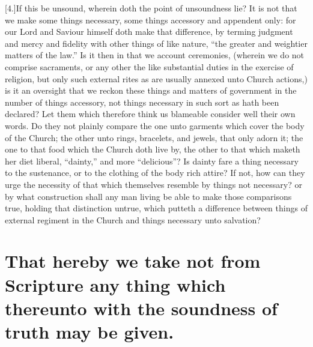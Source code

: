 [4.]If this be unsound, wherein doth the point of unsoundness lie? It is not that we make some things necessary, some things accessory and appendent only: for our Lord and Saviour himself doth make that difference, by terming judgment and mercy and fidelity with other things of like nature, “the greater and weightier matters of the law.” Is it then in that we account ceremonies, (wherein we do not comprise sacraments, or any other the like substantial duties in the  exercise of religion, but only such external rites as are usually annexed unto Church actions,) is it an oversight that we reckon these things and matters of government in the number of things accessory, not things necessary in such sort as hath been declared? Let them which therefore think us blameable consider well their own words. Do they not plainly compare the one unto garments which cover the body of the Church; the other unto rings, bracelets, and jewels, that only adorn it; the one to that food which the Church doth live by, the other to that which maketh her diet liberal, “dainty,” and more “delicious”? Is dainty fare a thing necessary to the sustenance, or to the clothing of the body rich attire? If not, how can they urge the necessity of that which themselves resemble by things not necessary? or by what construction shall any man living be able to make those comparisons true, holding that distinction untrue, which putteth a difference between things of external regiment in the Church and things necessary unto salvation?

\section*{That hereby we take not from Scripture any thing which thereunto with the soundness of truth may be given.}

